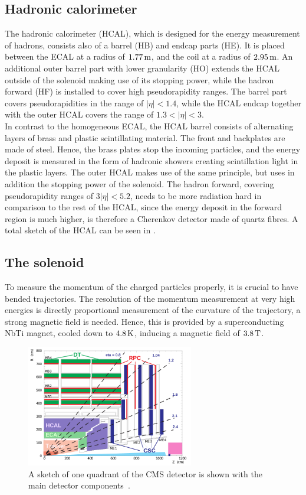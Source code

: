 \subsection{Hadronic calorimeter}
The hadronic calorimeter (HCAL), which is designed for the energy measurement of hadrons, consists also of a barrel (HB) and endcap parts (HE). It is placed between the ECAL at a radius of $1.77\,\text{m}$, and the coil at a radius of $2.95\,\text{m}$. An additional outer barrel part with lower granularity (HO) extends the HCAL outside of the solenoid making use of its stopping power, while the hadron forward (HF) is installed to cover high pseudorapidity ranges. The barrel part covers pseudorapidities in the range of $|\eta|<1.4$, while the HCAL endcap together with the outer HCAL covers the range of $1.3<|\eta|<3$.\\
In contrast to the homogeneous ECAL, the HCAL barrel consists of alternating layers of brass and plastic scintillating material. The front and backplates are made of steel. Hence, the brass plates stop the incoming particles, and the energy deposit is measured in the form of hadronic showers creating scintillation light in the plastic layers. The outer HCAL makes use of the same principle, but uses in addition the stopping power of the solenoid. The hadron forward, covering pseudorapidity ranges of $3|\eta|<5.2$, needs to be more radiation hard in comparison to the rest of the HCAL, since the energy deposit in the forward region is much higher, is therefore a Cherenkov detector made of quartz fibres. A total sketch of the HCAL can be seen in .

\subsection{The solenoid}
To measure the momentum of the  charged particles properly, it is crucial to have bended trajectories. The resolution of the momentum measurement at very high energies is directly proportional measurement of the curvature of the trajectory, a strong magnetic field is needed. Hence, this is provided by a superconducting NbTi magnet, cooled down to $4.8\,\text{K}$, inducing a magnetic field of $3.8\,\text{T}$.

\begin{figure}[hbtp]
 \centering
 \includegraphics[width=0.65\textwidth]{figures/general/CMS_eta.png}
 \caption{A sketch of one quadrant of the CMS detector is shown with the main detector components~\cite{CMSEta}.}
 \label{fig:etaPlaneCMSTotal}
\end{figure}

